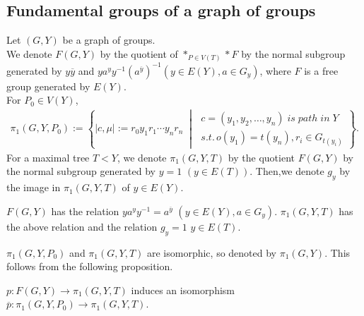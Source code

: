 \subsection{Fundamental groups of a graph of groups}

\begin{definition}
  Let $(G,Y)$ be a graph of groups.\\
  We denote $F(G,Y)$ by the quotient of $\ast_{P\in V(T)}\ast F$ by the normal subgroup generated by $y\overline{y}$ and $ya^yy^{-1}{(a^{\overline{y}})}^{-1} (y \in E(Y),a \in G_{y})$, where $F$ is a free group generated by $E(Y)$.\\
  For $P_0 \in V(Y)$,
  \begin{align*}
    \pi_1(G,Y,P_0) := \left\{ |c,\mu| := r_0y_1r_1\cdots y_nr_n  \;\middle|\;{\begin{gathered} c = (y_1,y_2, \ldots , y_n)\; is\; path\; in\; Y\;\\
    s.t.\, o(y_1)=t(y_n), r_i \in G_{t(y_i)}\end{gathered}}\right\}.
  \end{align*}
  For a maximal tree $T < Y$, we denote $\pi_1(G,Y,T)$ by the quotient $F(G,Y)$ by the normal subgroup generated by $y=1$ $(y \in E(T))$.
  Then,we denote $g_y$ by the image in $\pi_1(G,Y,T)$ of $y \in E(Y)$.
\end{definition}

\begin{remark}
  $F(G,Y)$ has the relation $ya^y y^{-1} =a^{\overline{y}}$ $(y \in E(Y), a \in G_y)$.
  $\pi_1(G,Y,T)$ has the above relation and the relation $g_y=1$ $y \in E(T)$.
\end{remark}

\begin{remark}
  $\pi_1(G,Y,P_0)$ and $\pi_1(G,Y,T)$ are isomorphic, so denoted by $\pi_1(G,Y)$.
  This follows from the following proposition.
\end{remark}

\begin{lemma}
  $p : F(G,Y) \rightarrow \pi_1(G,Y,T)$ induces an isomorphism $\overline{p} : \pi_1(G,Y,P_0) \rightarrow \pi_1(G,Y,T)$.
\end{lemma}


